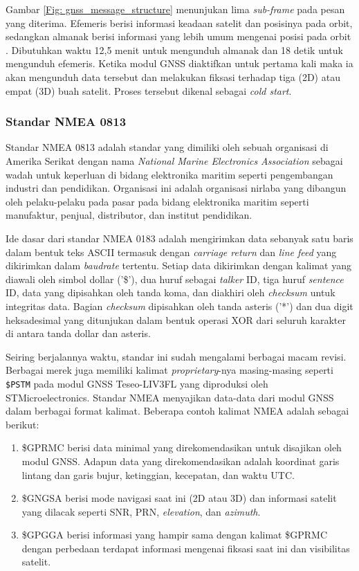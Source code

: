 Gambar \ref{Fig: gnss_message_structure} menunjukan lima \textit{sub-frame} pada pesan yang diterima. Efemeris berisi informasi keadaan satelit dan posisinya pada orbit, sedangkan almanak berisi informasi yang lebih umum mengenai posisi pada orbit \cite{Lenhart2022}. Dibutuhkan waktu 12,5 menit untuk mengunduh almanak dan 18 detik untuk mengunduh efemeris. Ketika modul GNSS diaktifkan untuk pertama kali maka ia akan mengunduh data tersebut dan melakukan fiksasi terhadap tiga (2D) atau empat (3D) buah satelit. Proses tersebut dikenal sebagai \textit{cold start}. 

\subsubsection{Standar NMEA 0813}
Standar NMEA 0813 adalah standar yang dimiliki oleh sebuah organisasi di Amerika Serikat dengan nama \textit{National Marine Electronics Association} sebagai wadah untuk keperluan di bidang elektronika maritim seperti pengembangan industri dan pendidikan. Organisasi ini adalah organisasi nirlaba yang dibangun oleh pelaku-pelaku pada pasar pada bidang elektronika maritim seperti manufaktur, penjual, distributor, dan institut pendidikan.

Ide dasar dari standar NMEA 0183 adalah mengirimkan data sebanyak satu baris dalam bentuk teks ASCII termasuk dengan \textit{carriage return} dan \textit{line feed} yang dikirimkan dalam \textit{baudrate} tertentu. Setiap data dikirimkan dengan kalimat yang diawali oleh simbol dollar ('\$'), dua huruf sebagai \textit{talker} ID, tiga huruf \textit{sentence} ID, data yang dipisahkan oleh tanda koma, dan diakhiri oleh \textit{checksum} untuk integritas data. Bagian \textit{checksum} dipisahkan oleh tanda asteris ('*') dan dua digit heksadesimal yang ditunjukan dalam bentuk operasi XOR dari seluruh karakter di antara tanda dollar dan asteris.

Seiring berjalannya waktu, standar ini sudah mengalami berbagai macam revisi. Berbagai merek juga memiliki kalimat \textit{proprietary}-nya masing-masing seperti \texttt{\$PSTM} pada modul GNSS Teseo-LIV3FL yang diproduksi oleh STMicroelectronics. Standar NMEA menyajikan data-data dari modul GNSS dalam berbagai format kalimat. Beberapa contoh kalimat NMEA adalah sebagai berikut:
\begin{enumerate}
	\item \$GPRMC berisi data minimal yang direkomendasikan untuk disajikan oleh modul GNSS. Adapun data yang direkomendasikan adalah koordinat garis lintang dan garis bujur, ketinggian, kecepatan, dan waktu UTC.
	\item \$GNGSA berisi mode navigasi saat ini (2D atau 3D) dan informasi satelit yang dilacak seperti SNR, PRN, \textit{elevation}, dan \textit{azimuth}.
	\item \$GPGGA berisi informasi yang hampir sama dengan kalimat \$GPRMC dengan perbedaan terdapat informasi mengenai fiksasi saat ini dan visibilitas satelit.
\end{enumerate}

